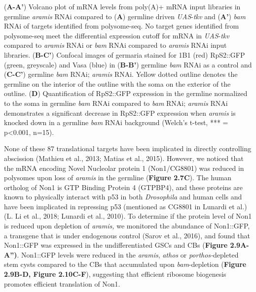 \documentclass[12pt,oneside]{reedthesis}
\begin{document}
\setlength\parindent{0pt}(\textbf{A-A'}) Volcano plot of mRNA levels from poly(A)+ mRNA input libraries in germline \emph{aramis} RNAi compared to (\textbf{A}) germline driven \emph{UAS}-\emph{tkv} and (\textbf{A'}) \emph{bam} RNAi of targets identified from polysome-seq. No target genes identified from polysome-seq meet the differential expression cutoff for mRNA in \emph{UAS}-\emph{tkv} compared to \emph{aramis} RNAi or \emph{bam} RNAi compared to \emph{aramis} RNAi input libraries. (\textbf{B-C'}) Confocal images of germaria stained for 1B1 (red) RpS2::GFP (green, greyscale) and Vasa (blue) in (\textbf{B-B'}) germline \emph{bam} RNAi as a control and (\textbf{C-C'}) germline \emph{bam} RNAi; \emph{aramis} RNAi. Yellow dotted outline denotes the germline on the interior of the outline with the soma on the exterior of the outline. (\textbf{D}) Quantification of RpS2::GFP expression in the germline normalized to the soma in germline \emph{bam} RNAi compared to \emph{bam} RNAi; \emph{aramis} RNAi demonstrates a significant decrease in RpS2::GFP expression when \emph{aramis} is knocked down in a germline \emph{bam} RNAi background (Welch's t-test, *** = p\textless0.001, n=15).

\setlength\parindent{24pt}

\textbf{\hfill\break
}

None of these 87 translational targets have been implicated in directly controlling abscission (Mathieu et al., 2013; Matias et al., 2015). However, we noticed that the mRNA encoding Novel Nucleolar protein 1 (Non1/CG8801) was reduced in polysomes upon loss of \emph{aramis} in the germline (\textbf{Figure 2.7C}). The human ortholog of Non1 is GTP Binding Protein 4 (GTPBP4), and these proteins are known to physically interact with p53 in both \emph{Drosophila} and human cells and have been implicated in repressing p53 (mentioned as CG8801 in Lunardi et al.) (L. Li et al., 2018; Lunardi et al., 2010). To determine if the protein level of Non1 is reduced upon depletion of \emph{aramis,} we monitored the abundance of Non1::GFP, a transgene that is under endogenous control (Sarov et al., 2016), and found that Non1::GFP was expressed in the undifferentiated GSCs and CBs (\textbf{Figure 2.9A-A'')}. Non1::GFP levels were reduced in the \emph{aramis}, \emph{athos} or \emph{porthos-}depleted stem cysts compared to the CBs that accumulated upon \emph{bam}-depletion (\textbf{Figure 2.9B-D, Figure 2.10C-F}), suggesting that efficient ribosome biogenesis promotes efficient translation of Non1.
\end{document}
